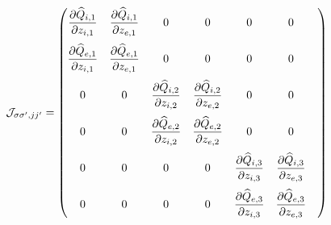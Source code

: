 \documentclass[dvips,12pt]{revtex4}
\newcommand\qhat{\widehat{Q}}
\newcommand{\sspjjp}{{\sigma\sigma^\prime,jj^\prime}}
\begin{document}
\begin{equation}
{\cal J}_{\sspjjp} = \begin{pmatrix}
\displaystyle \frac{\partial \qhat_{i,1}}{\partial z_{i,1}} &
\displaystyle \frac{\partial \qhat_{i,1}}{\partial z_{e,1}} &
0 & 0 & 0 & 0 \medskip \\
\displaystyle \frac{\partial \qhat_{e,1}}{\partial z_{i,1}} &
\displaystyle \frac{\partial \qhat_{e,1}}{\partial z_{e,1}} &
0 & 0 & 0 & 0 \medskip \\
0 & 0 &
\displaystyle \frac{\partial \qhat_{i,2}}{\partial z_{i,2}} &
\displaystyle \frac{\partial \qhat_{i,2}}{\partial z_{e,2}} &
0 & 0  \medskip \\
0 & 0 &
\displaystyle \frac{\partial \qhat_{e,2}}{\partial z_{i,2}} &
\displaystyle \frac{\partial \qhat_{e,2}}{\partial z_{e,2}} &
0 & 0  \medskip \\
0 & 0 & 0 & 0 &
\displaystyle \frac{\partial \qhat_{i,3}}{\partial z_{i,3}} &
\displaystyle \frac{\partial \qhat_{i,3}}{\partial z_{e,3}} &
\medskip \\
0 & 0 & 0 & 0 &
\displaystyle \frac{\partial \qhat_{e,3}}{\partial z_{i,3}} &
\displaystyle \frac{\partial \qhat_{e,3}}{\partial z_{e,3}} &
\end{pmatrix}
\end{equation}
\end{document}
